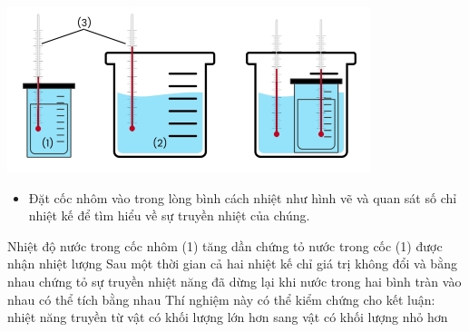 \begin{ex}
	{\includegraphics[scale=0.6]{../figs/Y24-VN12-PH-C2-BT-6}}
	\vspace{0.5cm}
\begin{itemize}
	\item Đặt cốc nhôm vào trong lòng bình cách nhiệt như hình vẽ và quan sát số chỉ nhiệt kế để tìm hiểu về sự truyền nhiệt của chúng.
\end{itemize}
	{\True Nhiệt độ nước trong cốc nhôm (1) tăng dần chứng tỏ nước trong cốc (1) được nhận nhiệt lượng}
	{Sau một thời gian cả hai nhiệt kế chỉ giá trị không đổi và bằng nhau chứng tỏ sự truyền nhiệt năng đã dừng lại khi nước trong hai bình tràn vào nhau có thể tích bằng nhau}
	{Thí nghiệm này có thể kiểm chứng cho kết luận: nhiệt năng truyền từ vật có khối lượng lớn hơn sang vật có khối lượng nhỏ hơn}
	\loigiai{}
\end{ex}
